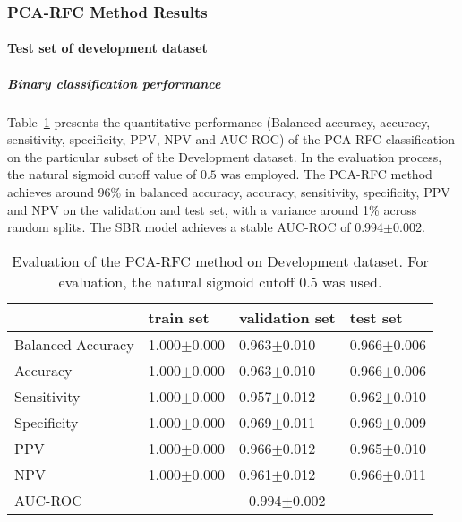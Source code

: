 


\subsubsection{PCA-RFC Method Results}
\label{subsubsec:eval_rfc}


\paragraph{Test set of development dataset}


\subparagraph{Binary classification performance}


Table~\ref{t1:erc_perf_eval_table} presents the quantitative performance 
(Balanced accuracy, accuracy, sensitivity, specificity, PPV, NPV and AUC-ROC) of the PCA-RFC classification on the 
particular subset of the Development dataset.
In the evaluation process, the natural sigmoid cutoff value of $0.5$ was employed.
The PCA-RFC method achieves around 96\% in balanced accuracy, accuracy, sensitivity, specificity, PPV and NPV 
on the validation and test set, with a variance around 1\% across random splits.
The SBR model achieves a stable AUC-ROC of 0.994$\pm$0.002.


\begin{table}[ht]
  \caption{Evaluation of the PCA-RFC method on Development dataset. 
  For evaluation, the natural sigmoid cutoff $0.5$ was used.}
  \centering
  \begin{tabular}{llll}
      \hline
                        & train set         & validation set      & test set             \\
      \hline
      Balanced Accuracy & 1.000$\pm$0.000   &   0.963$\pm$0.010    &  0.966$\pm$0.006   \\
      Accuracy          & 1.000$\pm$0.000    &   0.963$\pm$0.010  &  0.966$\pm$0.006    \\
      Sensitivity       &  1.000$\pm$0.000   &   0.957$\pm$0.012   &  0.962$\pm$0.010   \\
      Specificity       & 1.000$\pm$0.000    &   0.969$\pm$0.011  &  0.969$\pm$0.009   \\
      PPV               &  1.000$\pm$0.000   &   0.966$\pm$0.012   &  0.965$\pm$0.010   \\
      NPV               &  1.000$\pm$0.000   &   0.961$\pm$0.012  &  0.966$\pm$0.011   \\
      \hline
      AUC-ROC          &  \multicolumn{3}{c}{0.994$\pm$0.002}  \\
      \hline
  \end{tabular}
 \label{t1:erc_perf_eval_table}
\end{table}


